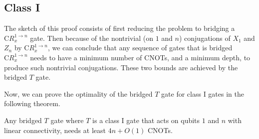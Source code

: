 \subsection{Class I}

The sketch of this proof consists of first reducing the problem to bridging a $\mathrm{C}R_x^{1\to n}$ gate. Then because of the nontrivial (on $1$ and $n$) conjugations of $X_1$ and $Z_n$ by $\mathrm{C}R_x^{1\to n}$, we can conclude that any sequence of gates that is bridged $\mathrm{C}R_x^{1\to n}$ needs to have a minimum number of CNOTs, and a minimum depth, to produce such nontrivial conjugations. These two bounds are achieved by the bridged $T$ gate.

Now, we can prove the optimality of the bridged $T$ gate for class I gates in the following theorem.

\begin{theorem}\label{thm:no-go-class-i}
  Any bridged $T$ gate where $T$ is a class I gate that acts on qubits $1$ and $n$ with linear connectivity, needs at least $4n + O(1)$ CNOTs.
\end{theorem}
